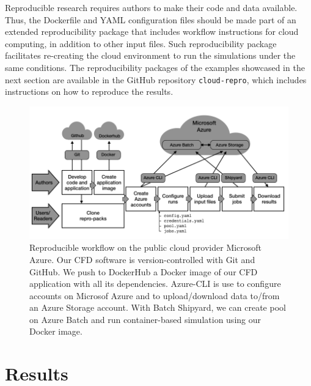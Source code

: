 \documentclass[10pt,journal,compsoc]{IEEEtran}
\begin{document}
Reproducible research requires authors to make their code and data available.
Thus, the Dockerfile and YAML configuration files should be made part of an extended reproducibility package that includes workflow instructions for cloud computing, in addition to other input files.
Such reproducibility package facilitates re-creating the cloud environment to run the simulations under the same conditions.
The reproducibility packages of the examples showcased in the next section are available in the GitHub repository \texttt{cloud-repro}, which includes instructions on how to reproduce the results.

\begin{figure}[!h]
    \centering
    \includegraphics[width=14cm]{figures/cloud_workflow.png}
    \caption{Reproducible workflow on the public cloud provider Microsoft Azure. Our CFD software is version-controlled with Git and GitHub. We push to DockerHub a Docker image of our CFD application with all its dependencies. Azure-CLI is use to configure accounts on Microsof Azure and to upload/download data to/from an Azure Storage account. With Batch Shipyard, we can create pool on Azure Batch and run container-based simulation using our Docker image.}
    \label{fig:cloud_workflow}
\end{figure}

\section{Results}\label{sec:results}
\end{document}
